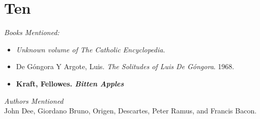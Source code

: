 \documentclass[12pt,makeidx]{extreport}
\newcommand\fleuron{\begin{turn}{45}\Large \ding{166}\end{turn}}
\newcommand\doublefleuron{%
	\reflectbox{\fleuron}\AC\staveXLIX\reflectbox{\AC}\fleuron}
\newcommand\fleuronbar{%
	{\huge\LinearACCCXIII}\xrfill[1.3ex]{1pt}\doublefleuron\xrfill[1.3ex]{1pt}\reflectbox{\huge\LinearACCCXIII}}
\newcommand\blankpage{%
    \null
    \thispagestyle{empty}%
    \addtocounter{page}{-1}%
    \newpage%
    \pagestyle{fancy}}
\newcommand\nbvspace[1][3]{\vspace*{\stretch{#1}}}
\begin{document}
\section{Ten}
\textit{Books Mentioned:}
\begin{itemize}
\item \textit{Unknown volume of The Catholic Encyclopedia}. \cite{Herbermann1908}
\item De Góngora Y Argote, Luis. \textit{The Solitudes of Luis De Góngora}. 1968. \cite{DeGongoraYArgote1968}
\item \textbf{Kraft, Fellowes. \textit{Bitten Apples}} \cite{Kraftb}
\end{itemize}
\textit{Authors Mentioned}\\
John Dee, Giordano Bruno, Origen, Descartes, Peter Ramus, and Francis Bacon.

\begin{center}
\vfill
\shadowoffset{1pt}
\\
\nbvspace[1]
\end{center}


{}

\begin{center}
\vfill
\shadowoffset{1pt}
\shadowtext{%
{\color{Mahogany}\fontsize{64}{64}\Mercury}}\\
\nbvspace[1]
\end{center}


%



%
\end{document}
